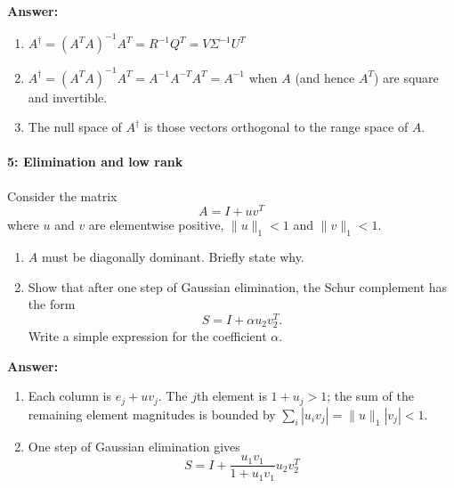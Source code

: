 \documentclass[12pt, leqno]{article}
\begin{document}
{\bf Answer:}
\begin{enumerate}
\item $A^\dagger = (A^TA)^{-1} A^T = R^{-1} Q^T = V \Sigma^{-1} U^T$
\item $A^\dagger = (A^T A)^{-1} A^T = A^{-1} A^{-T} A^T = A^{-1}$ when
  $A$ (and hence $A^T$) are square and invertible.
\item The null space of $A^{\dagger}$ is those vectors orthogonal
  to the range space of $A$.
\end{enumerate}

\paragraph*{5: Elimination and low rank}
Consider the matrix
\[
  A = I + uv^T
\]
where $u$ and $v$ are elementwise positive, $\|u\|_1 < 1$ and $\|v\|_1 < 1$.
\begin{enumerate}
\item
  $A$ must be diagonally dominant.  Briefly state why.
\item
  Show that after one step of Gaussian elimination,
  the Schur complement has the form
  \[
    S = I + \alpha u_2 v_2^T.
  \]
  Write a simple expression for the coefficient $\alpha$.
\end{enumerate}

{\bf Answer:}
\begin{enumerate}
\item
  Each column is $e_j + u v_j$.  The $j$th element is $1 + u_j > 1$;
  the sum of the remaining element magnitudes is bounded by 
  $\sum_i |u_i v_j| = \|u\|_1 |v_j| < 1$.
\item
  One step of Gaussian elimination gives
  \[
    S = I + \frac{u_1 v_1}{1 + u_1 v_1} u_2 v_2^T
  \]
\end{enumerate}
\end{document}
